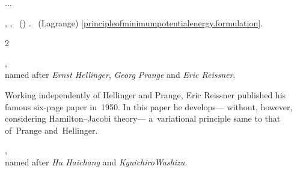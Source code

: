 ...

 , ,  ~() .
    ~(Lagrange)  \eqref{principleofminimumpotentialenergy.formulation}.



\label{para:mixedvariationalprinciples}

\vspace{.2em}\begin{changemargin}{2\parindent}{\parindent}
\bgroup %
\setlength{\parindent}{\negparindent}
\small

\hspace{\parindent}\href{https://en.wikiversity.org/wiki/Introduction_to_Elasticity/Hellinger-Reissner_principle}{},\\
named after \emph{Ernst Hellinger}, \emph{Georg Prange} and \emph{Eric Reissner}.
\par

\nopagebreak\vspace{.16em}
{\scriptsize \noindent Working independently of Hellinger and Prange, Eric Reissner published his famous six\hbox{-}page paper  in~1950. In this paper he develops\:--- without, however, considering Hamilton\hbox{--}Jacobi theory\:--- a~variational principle same to that of~Prange and~Hellinger.\par}

\nopagebreak\vspace{.32em}
\href{https://en.wikiversity.org/wiki/Introduction_to_Elasticity/Hu-Washizu_principle}{},\\
named after \emph{Hu Haichang} and \emph{Kyuichiro\;Washizu}.
\par
\egroup
\nopagebreak\vspace{.1em}
\end{changemargin}

